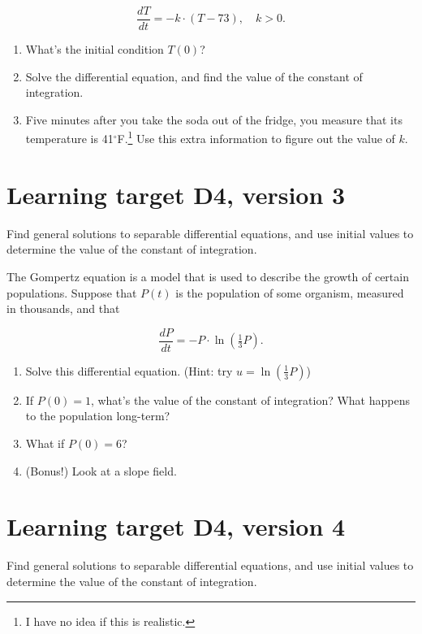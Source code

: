 \[\dfrac{dT}{dt} = -k \cdot(T-73), \quad k > 0.
\]

\begin{enumerate}
	\item What's the initial condition $T(0)$?
	\vspace{2em}
	\item Solve the differential equation, and find the value of the constant of integration.
	\vfill
	\vfill
	\item Five minutes after you take the soda out of the fridge, you measure that its temperature is 41$^\circ$F.\footnote{I have no idea if this is realistic.} Use this extra information to figure out the value of $k$.
	\vfill
\end{enumerate}
\pagebreak
\section{Learning target D4, version 3}

Find general solutions to separable differential equations, and use initial values to determine the value of the constant of integration.

\hrulefill

The Gompertz equation is a model that is used to describe the growth of certain populations. Suppose that $P(t)$ is the population of some organism, measured in thousands, and that

\[\dfrac{dP}{dt} = -P \cdot \ln\left(\tfrac{1}{3}P\right).
\]

\begin{enumerate}
	\item Solve this differential equation. (Hint: try $u = \ln(\tfrac{1}{3}P)$)

	\vfill

	\item If $P(0) = 1$, what's the value of the constant of integration? What happens to the population long-term?
	\vfill
	\item What if $P(0) = 6$?
	\vfill
	\item (Bonus!) Look at a slope field.
\end{enumerate}
\pagebreak
\section{Learning target D4, version 4}

Find general solutions to separable differential equations, and use initial values to determine the value of the constant of integration.

